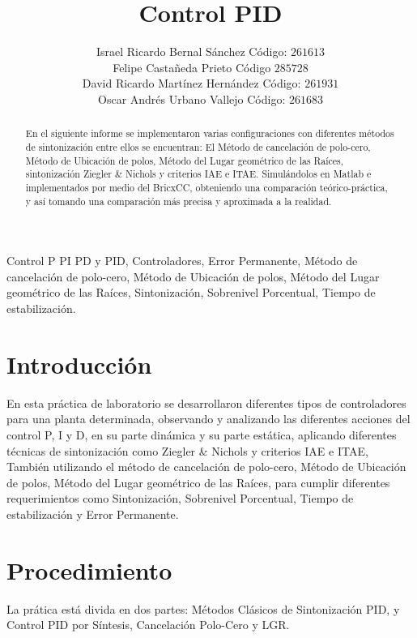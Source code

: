 \documentclass[twocolumn]{IEEEtran}
\begin{document}
\title{Control PID}
\author{Israel Ricardo Bernal Sánchez Código: $261613$\\
	Felipe Castañeda Prieto Código $285728$\\
	David Ricardo Martínez Hernández Código: $261931$\\
	Oscar Andrés Urbano Vallejo Código: $261683$}
\maketitle
{}

\begin{abstract}
 En el siguiente informe se implementaron varias configuraciones con diferentes métodos de sintonización entre ellos se encuentran: El Método de cancelación de polo-cero, Método de Ubicación de polos, Método del Lugar geométrico de las Raíces, sintonización Ziegler \& Nichols y criterios IAE e ITAE. Simulándolos en Matlab e implementados por medio del BricxCC, obteniendo una comparación teórico-práctica, y así tomando una comparación  más precisa y aproximada a la realidad.
\end{abstract}

\begin{keywords}
 Control P PI PD y PID, Controladores, Error Permanente, Método de cancelación de polo-cero, Método de Ubicación de polos, Método del Lugar geométrico de las Raíces, Sintonización, Sobrenivel Porcentual, Tiempo de estabilización.
\end{keywords}

\section{Introducción}
\noindent
En esta práctica de laboratorio se desarrollaron diferentes tipos de controladores para una planta determinada, observando y analizando las diferentes acciones del control P, I y D, en su parte dinámica y su parte estática, aplicando diferentes técnicas de sintonización como Ziegler \& Nichols y criterios IAE e ITAE, También utilizando el método de cancelación de polo-cero, Método de Ubicación de polos, Método del Lugar geométrico de las Raíces, para cumplir diferentes requerimientos como  Sintonización, Sobrenivel Porcentual, Tiempo de estabilización y Error Permanente.\\

\section{Procedimiento}
\noindent
La prática está divida en dos partes: Métodos Clásicos de Sintonización PID, y Control PID por Síntesis, Cancelación Polo-Cero y LGR.
\end{document}
